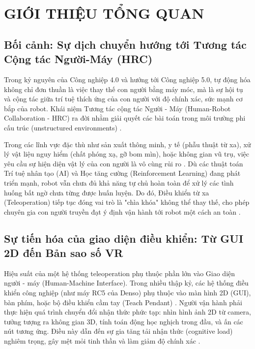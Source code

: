 \chapter{GIỚI THIỆU TỔNG QUAN}
\label{chap:intro}

\section{Bối cảnh: Sự dịch chuyển hướng tới Tương tác Cộng tác Người-Máy (HRC)}
Trong kỷ nguyên của Công nghiệp 4.0 và hướng tới Công nghiệp 5.0, tự động hóa không chỉ đơn thuần là việc thay thế con người bằng máy móc, mà là sự hội tụ và cộng tác giữa trí tuệ thích ứng của con người với độ chính xác, sức mạnh cơ bắp của robot. Khái niệm Tương tác cộng tác Người - Máy (Human-Robot Collaboration - HRC) ra đời nhằm giải quyết các bài toán trong môi trường phi cấu trúc (unstructured environments) \cite{wang2024genealogy}. 

Trong các lĩnh vực đặc thù như sản xuất thông minh, y tế (phẫu thuật từ xa), xử lý vật liệu nguy hiểm (chất phóng xạ, gỡ bom mìn), hoặc không gian vũ trụ, việc yêu cầu sự hiện diện vật lý của con người là vô cùng rủi ro \cite{autolab2021telesurgery}. Dù các thuật toán Trí tuệ nhân tạo (AI) và Học tăng cường (Reinforcement Learning) \cite{han2023survey} đang phát triển mạnh, robot vẫn chưa đủ khả năng tự chủ hoàn toàn để xử lý các tình huống bất ngờ chưa từng được huấn luyện. Do đó, Điều khiển từ xa (Teleoperation) tiếp tục đóng vai trò là "chìa khóa" không thể thay thế, cho phép chuyên gia con người truyền đạt ý định vận hành tới robot một cách an toàn \cite{darvish2023teleoperation}.

\section{Sự tiến hóa của giao diện điều khiển: Từ GUI 2D đến Bản sao số VR}
Hiệu suất của một hệ thống teleoperation phụ thuộc phần lớn vào Giao diện người - máy (Human-Machine Interface). Trong nhiều thập kỷ, các hệ thống điều khiển công nghiệp (như máy RC5 của Denso) phụ thuộc vào màn hình 2D (GUI), bàn phím, hoặc bộ điều khiển cầm tay (Teach Pendant) \cite{hetrick2020comparing}. Người vận hành phải thực hiện quá trình chuyển đổi nhận thức phức tạp: nhìn hình ảnh 2D từ camera, tưởng tượng ra không gian 3D, tính toán động học nghịch trong đầu, và ấn các nút tương ứng. Điều này dẫn đến sự gia tăng tải nhận thức (cognitive load) nghiêm trọng, gây mệt mỏi tinh thần và làm giảm độ chính xác \cite{chen2023comparing}.

